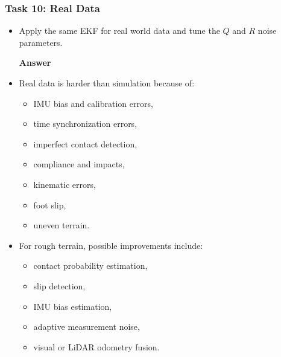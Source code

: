 \documentclass[aspectratio=169]{beamer}
\begin{document}
\begin{frame}
	\frametitle{Task 10: Real Data}
	
	\begin{itemize}	
		
		\item Apply the same EKF for real world data and tune the $Q$ and $R$ noise parameters.
		
		\pause
		\textbf{Answer}
		\item Real data is harder than simulation because of:
		\begin{itemize}
			\item IMU bias and calibration errors,
			\item time synchronization errors,
			\item imperfect contact detection,
			\item compliance and impacts,
			\item kinematic errors,
			\item foot slip,
			\item uneven terrain.
		\end{itemize}
		
		\item For rough terrain, possible improvements include:
		\begin{itemize}
			\item contact probability estimation,
			\item slip detection,
			\item IMU bias estimation,
			\item adaptive measurement noise,
			\item visual or LiDAR odometry fusion.
		\end{itemize}
	\end{itemize}
	
\end{frame}
\end{document}
